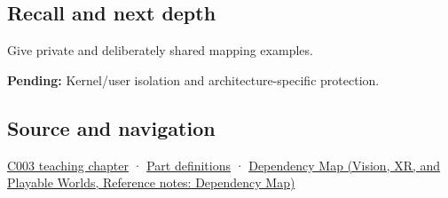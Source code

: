 \subsection{Recall and next depth}\label{appendix-c2a9ad1e2b49-recall-and-next-depth}

Give private and deliberately shared mapping examples.

\textbf{Pending:} Kernel/user isolation and architecture-specific protection.

\subsection{Source and navigation}\label{appendix-c2a9ad1e2b49-source-and-navigation}

\hyperref[01-foundations-i-ch002-where-the-bytes-live]{C003 teaching chapter} · \hyperref[appendix-fd090d982a15-m003---parts-41-60]{Part definitions} · \href{../07-Vision-XR-and-Playable-Worlds/main.pdf\#nameddest=appendix-4ad47bdd269a}{Dependency Map (Vision, XR, and Playable Worlds, Reference notes: Dependency Map)}
